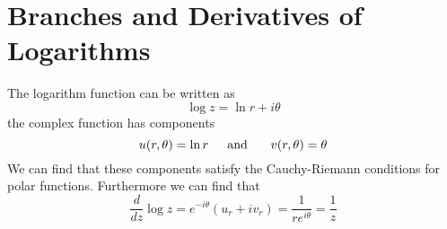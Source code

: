 \section{Branches and Derivatives of Logarithms}
The logarithm function can be written as \[ \log z = \ln r + i \theta \] the complex function has components 
\[ u(r,\theta) = \ln r \text{\indent and \indent} v(r,\theta) = \theta  \] 
We can find that these components satisfy the Cauchy-Riemann conditions for polar functions. Furthermore we can find that \[ \dfrac{d}{dz} \log z = e^{-i \theta}(u_r + iv_r) = \dfrac{1}{re^{i \theta}} = \dfrac{1}{z} \]
